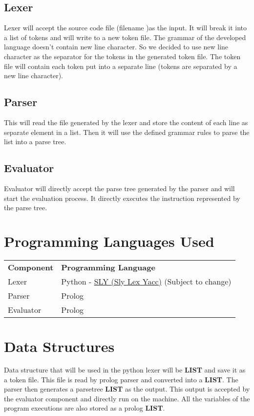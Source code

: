 \documentclass[12pt,letterpaper]{article}
\begin{document}
\subsection{Lexer}
Lexer will accept the source code file (filename )as the input. It will break it into a list of tokens and will write to a new token file. The grammar of the developed language doesn't contain new line character. So we decided to use new line character as the separator for the tokens in the generated token file. The token file will contain each token put into a separate line (tokens are separated by a new line character).
\subsection{Parser}
This will read the file generated by the lexer and store the content of each line as separate element in a list. Then it will use the defined grammar rules to parse the list into a parse tree.
\subsection{Evaluator}
Evaluator will directly accept the parse tree generated by the parser and will start the evaluation process. It directly executes the instruction represented by the parse tree.

\section{Programming Languages Used}
\begin{tabular}{ll}
    \textbf{Component} & \textbf{Programming Language} \\
    Lexer & Python - \href{https://sly.readthedocs.io/en/latest/sly.html}{SLY (Sly Lex Yacc)} (Subject to change) \\
    Parser & Prolog \\
    Evaluator & Prolog
\end{tabular}

\section{Data Structures}
Data structure that will be used in the python lexer will be \textbf{LIST} and save it as a token file. This file is read by prolog parser and converted into a \textbf{LIST}. The parser then generates a parsetree \textbf{LIST} as the output. This output is accepted by the evaluator component and directly run on the machine. All the variables of the program executions are also stored as a prolog \textbf{LIST}.
\end{document}
